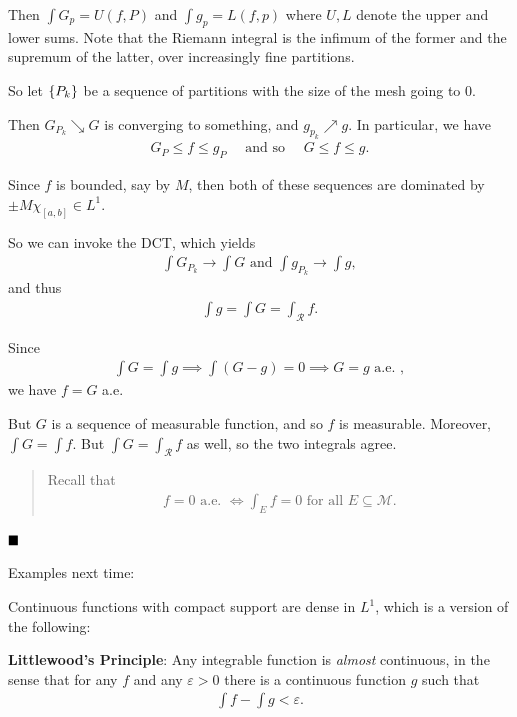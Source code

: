 Then \(\int G_p = U(f, P)\) and \(\int g_p = L(f, p)\) where \(U, L\)
denote the upper and lower sums. Note that the Riemann integral is the
infimum of the former and the supremum of the latter, over increasingly
fine partitions.

So let \(\left\{{P_k}\right\}\) be a sequence of partitions with the size of the
mesh going to 0.

Then \(G_{P_k} \searrow G\) is converging to something, and
\(g_{p_k} \nearrow g\). In particular, we have
\begin{align*}
G_P \leq f \leq g_P \quad \text{ and so }\quad G \leq f \leq g
.\end{align*}

Since \(f\) is bounded, say by \(M\), then both of these sequences are
dominated by \(\pm M \chi_{[a, b]} \in L^1\).

So we can invoke the DCT, which yields
\begin{align*}
\int G_{P_k} \to \int G \text{ and } \int g_{P_k} \to \int g
,\end{align*} and thus
\begin{align*}
\int g = \int G = \int_\mathcal{R} f
.\end{align*}

Since
\begin{align*}
\int G = \int g \implies \int (G-g) = 0 \implies G = g \text{ a.e. }
,\end{align*} we have \(f = G\) a.e.

But \(G\) is a sequence of measurable function, and so \(f\) is
measurable. Moreover, \(\int G = \int f\). But
\(\int G = \int_\mathcal{R} f\) as well, so the two integrals agree.

\begin{quote}
Recall that
\begin{align*}
f = 0 \text{ a.e. } \iff \int_E f = 0 \text{ for all } E \subseteq \mathcal{M}
.\end{align*}
\end{quote}

\(\qed\)

Examples next time:

Continuous functions with compact support are dense in \(L^1\), which is
a version of the following:

\textbf{Littlewood's Principle}: Any integrable function is \emph{almost
} continuous, in the sense that for any \(f\) and any \(\varepsilon >0\)
there is a continuous function \(g\) such that
\begin{align*}
\int f - \int g < \varepsilon
.\end{align*}

